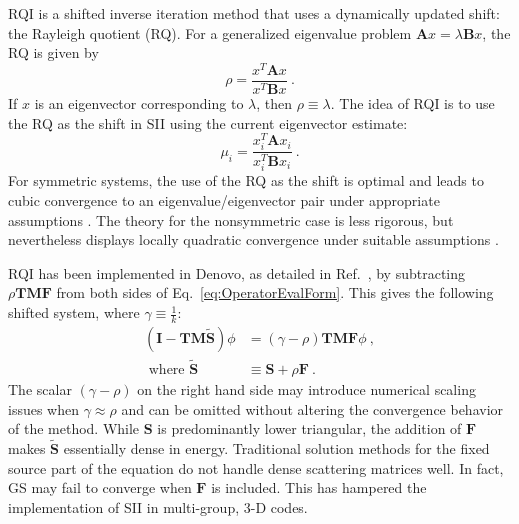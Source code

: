 \documentclass{article}                                                                           %
\newcommand{\ve}[1]{\ensuremath{\mathbf{#1}}}
\begin{document}

RQI is a shifted inverse iteration method
that uses a dynamically updated shift: the Rayleigh quotient (RQ). For a generalized eigenvalue problem $\ve{A}x = \lambda \ve{B}x$, the RQ is given by
%
\begin{equation}
  \rho = \frac{x^{T} \ve{A} x}{x^{T} \ve{B} x} \:.
  \label{eq:RQ}
\end{equation}
%
If $x$ is an eigenvector corresponding to $\lambda$, then $\rho \equiv \lambda$.
The idea of RQI is to use the RQ as the shift in SII using the current eigenvector estimate:
%
\begin{equation}
  \mu_i = \frac{x_i^{T} \ve{A} x_i}{x_i^{T} \ve{B} x_i} \:.
  \label{eq:Shift}
\end{equation} 
%
For symmetric systems, the use of the RQ as the shift is optimal and leads to cubic convergence to an eigenvalue/eigenvector pair under appropriate assumptions \cite{Parlett1974}.  The theory for the nonsymmetric case is less rigorous, but nevertheless displays locally quadratic convergence under suitable assumptions \cite{SaadEig}.

RQI has been implemented in Denovo, as detailed in Ref.\ \cite{Slaybaugh2012}, by subtracting $\rho \ve{TMF}$ from both sides of Eq.\ \eqref{eq:OperatorEvalForm}. This gives the following shifted system, where $\gamma \equiv \frac{1}{k}$:
%
\begin{align}
  (\ve{I} - \ve{TM}\ve{\tilde{S}})\phi &=( \gamma - \rho) \ve{TMF} \phi  \:, 
  \label{eq:OperatorShiftedEval} \\
  \text{ where } \ve{\tilde{S}} &\equiv \ve{S} + \rho\ve{F}  \nonumber \:.
\end{align}
%
The scalar $(\gamma - \rho)$ on the right hand side may introduce numerical scaling issues when $\gamma \approx \rho$ and can be omitted without altering the convergence behavior of the method.  While $\ve{S}$ is predominantly lower triangular, the addition of $\ve{F}$ makes $\ve{\tilde{S}}$ essentially dense in energy.
Traditional solution methods for the fixed source part of the equation do not handle dense scattering matrices well. In fact, GS may fail to converge when $\ve{F}$ is included.  This has hampered the implementation of SII in multi-group, 3-D codes.
\end{document}
